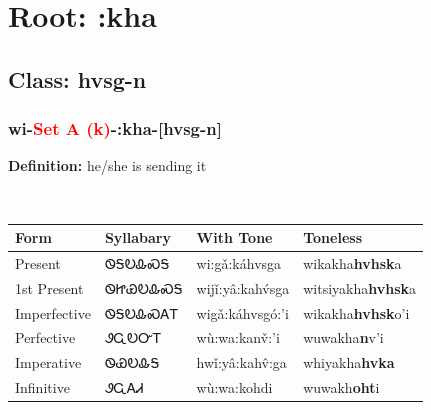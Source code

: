 \needspace{4in}
\section*{Root: :kha}
\nopagebreak
{}
\needspace{3in}
\subsection*{Class: hvsg-n}
\nopagebreak
\needspace{2in}
\subsubsection*{wi{-}\textcolor{Red}{Set A (k)}{-}\textbf{:kha}{-}[hvsg-n]}
\nopagebreak
\textbf{Definition: } he/she is sending it
\\[0.5em]
\begin{tabularx}{\textwidth}{l X X X}%
\toprule%
\textbf{Form}&\textbf{Syllabary}&\textbf{With Tone}&\textbf{Toneless}\\%
\midrule%
Present&ᏫᎦᎧᎲᏍᎦ&wi:gǎ:káhvsga&wikakha\textbf{hvhsk}a\\%
1st Present&ᏫᏥᏯᎧᎲᏍᎦ&wijǐ:yâ:kahv́sga&witsiyakha\textbf{hvhsk}a\\%
Imperfective&ᏫᎦᎧᎲᏍᎪᎢ&wigǎ:káhvsgó:’i&wikakha\textbf{hvhsk}o'i\\%
Perfective&ᏭᏩᎧᏅᎢ&wù:wa:kanv̌:’i&wuwakha\textbf{n}v'i\\%
Imperative&ᏫᏯᎧᎲᎦ&hwǐ:yâ:kahv̂:ga&whiyakha\textbf{hvka}\\%
Infinitive&ᏭᏩᎪᏗ&wù:wa:kohdi&wuwakh\textbf{oht}i\\%
\bottomrule%
\end{tabularx}
\\[1em]
